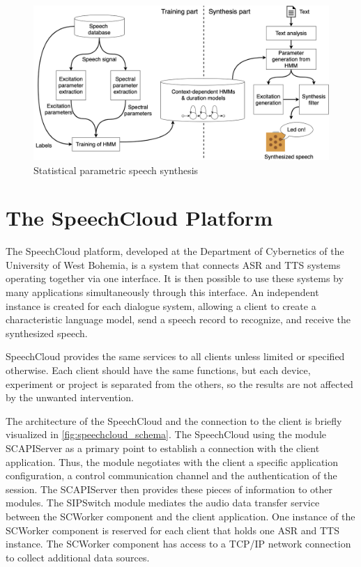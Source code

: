 \begin{figure}[H]
    \centering
    \includegraphics[width=\textwidth]{img/synthesis_model.png}
    \caption{Statistical parametric speech synthesis \citep{statistical_parametric_speech_synthesis_ZEN20091039}}
    \label{fig:synthesis_model}
\end{figure}


\section{The SpeechCloud Platform}

The SpeechCloud platform, developed at the Department of Cybernetics of the University of West Bohemia, is a system that connects ASR and TTS systems operating together via one interface. It is then possible to use these systems by many applications simultaneously through this interface. An independent instance is created for each dialogue system, allowing a client to create a characteristic language model, send a speech record to recognize, and receive the synthesized speech.

SpeechCloud provides the same services to all clients unless limited or specified otherwise. Each client should have the same functions, but each device, experiment or project is separated from the others, so the results are not affected by the unwanted intervention.

The architecture of the SpeechCloud and the connection to the client is briefly visualized in \cref{fig:speechcloud_schema}. The SpeechCloud using the module SCAPIServer as a primary point to establish a connection with the client application. Thus, the module negotiates with the client a specific application configuration, a control communication channel and the authentication of the session. The SCAPIServer then provides these pieces of information to other modules. The SIPSwitch module mediates the audio data transfer service between the SCWorker component and the client application. One instance of the SCWorker component is reserved for each client that holds one ASR and TTS instance. The SCWorker component has access to a TCP/IP network connection to collect additional data sources.

